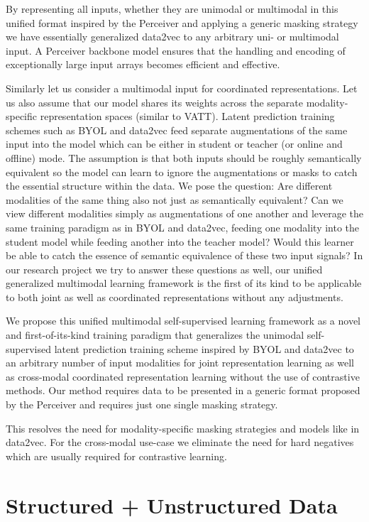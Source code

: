 \documentclass[
]{krantz}
\begin{document}
By representing all inputs, whether they are unimodal or multimodal in this unified format inspired by the Perceiver and applying a generic masking strategy we have essentially generalized data2vec to any arbitrary uni- or multimodal input. A Perceiver backbone model ensures that the handling and encoding of exceptionally large input arrays becomes efficient and effective.

Similarly let us consider a multimodal input for coordinated representations. Let us also assume that our model shares its weights across the separate modality-specific representation spaces (similar to VATT). Latent prediction training schemes such as BYOL and data2vec feed separate augmentations of the same input into the model which can be either in student or teacher (or online and offline) mode. The assumption is that both inputs should be roughly semantically equivalent so the model can learn to ignore the augmentations or masks to catch the essential structure within the data. We pose the question: Are different modalities of the same thing also not just as semantically equivalent? Can we view different modalities simply as augmentations of one another and leverage the same training paradigm as in BYOL and data2vec, feeding one modality into the student model while feeding another into the teacher model? Would this learner be able to catch the essence of semantic equivalence of these two input signals? In our research project we try to answer these questions as well, our unified generalized multimodal learning framework is the first of its kind to be applicable to both joint as well as coordinated representations without any adjustments.

We propose this unified multimodal self-supervised learning framework as a novel and first-of-its-kind training paradigm that generalizes the unimodal self-supervised latent prediction training scheme inspired by BYOL and data2vec to an arbitrary number of input modalities for joint representation learning as well as cross-modal coordinated representation learning without the use of contrastive methods. Our method requires data to be presented in a generic format proposed by the Perceiver and requires just one single masking strategy.

This resolves the need for modality-specific masking strategies and models like in data2vec. For the cross-modal use-case we eliminate the need for hard negatives which are usually required for contrastive learning.

\hypertarget{c03-02-structured-unstructured}{%
\section{Structured + Unstructured Data}\label{c03-02-structured-unstructured}}
\end{document}
